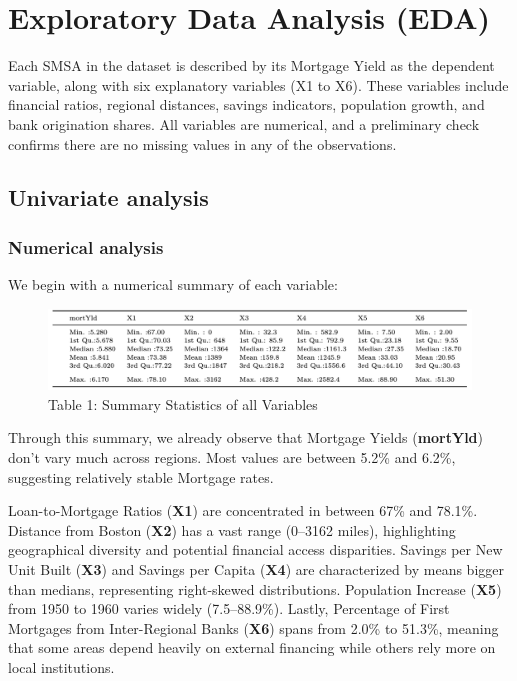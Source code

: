 \documentclass[
  12pt,
]{article}
\begin{document}
\section{Exploratory Data Analysis
(EDA)}\label{exploratory-data-analysis-eda}

Each SMSA in the dataset is described by its Mortgage Yield as the
dependent variable, along with six explanatory variables (X1 to X6).
These variables include financial ratios, regional distances, savings
indicators, population growth, and bank origination shares. All
variables are numerical, and a preliminary check confirms there are no
missing values in any of the observations.

\subsection{Univariate analysis}\label{univariate-analysis}

\subsubsection{Numerical analysis}\label{numerical-analysis}

We begin with a numerical summary of each variable:

\vspace{-0.5cm}
\begin{figure}[H]
\centering
\includegraphics[width=1.0\textwidth]{figures/Table 1.png}
\captionsetup{font=normalsize}
\caption*{Table 1: Summary Statistics of all Variables}
\end{figure}
\vspace{-0.5cm}

Through this summary, we already observe that Mortgage Yields
(\textbf{mortYld}) don't vary much across regions. Most values are
between 5.2\% and 6.2\%, suggesting relatively stable Mortgage rates.

Loan-to-Mortgage Ratios (\textbf{X1}) are concentrated in between 67\%
and 78.1\%. Distance from Boston (\textbf{X2}) has a vast range (0--3162
miles), highlighting geographical diversity and potential financial
access disparities. Savings per New Unit Built (\textbf{X3}) and Savings
per Capita (\textbf{X4}) are characterized by means bigger than medians,
representing right-skewed distributions. Population Increase
(\textbf{X5}) from 1950 to 1960 varies widely (7.5--88.9\%). Lastly,
Percentage of First Mortgages from Inter-Regional Banks (\textbf{X6})
spans from 2.0\% to 51.3\%, meaning that some areas depend heavily on
external financing while others rely more on local institutions.
\vspace{-1em}
\end{document}
